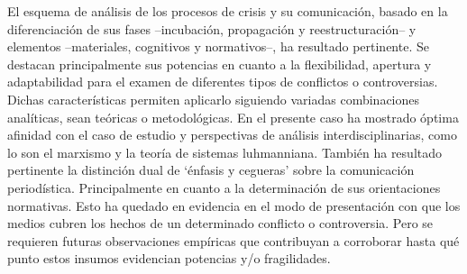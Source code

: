 \documentclass{textolivre}
\begin{document}
El esquema de análisis de los procesos de crisis y su comunicación, basado en la
diferenciación de sus fases --incubación, propagación y reestructuración-- y elementos
--materiales, cognitivos y normativos--, ha resultado pertinente. Se destacan
principalmente sus potencias en cuanto a la flexibilidad, apertura y adaptabilidad para el
examen de diferentes tipos de conflictos o controversias. Dichas características permiten
aplicarlo siguiendo variadas combinaciones analíticas, sean teóricas o metodológicas. En
el presente caso ha mostrado óptima afinidad con el caso de estudio y perspectivas de
análisis interdisciplinarias, como lo son el marxismo y la teoría de sistemas luhmanniana.
También ha resultado pertinente la distinción dual de ‘énfasis y cegueras’ sobre la
comunicación periodística. Principalmente en cuanto a la determinación de sus
orientaciones normativas. Esto ha quedado en evidencia en el modo de presentación con
que los medios cubren los hechos de un determinado conflicto o controversia. Pero se
requieren futuras observaciones empíricas que contribuyan a corroborar hasta qué punto
estos insumos evidencian potencias y/o fragilidades.




\printbibliography\label{sec-bib}
\end{document}

